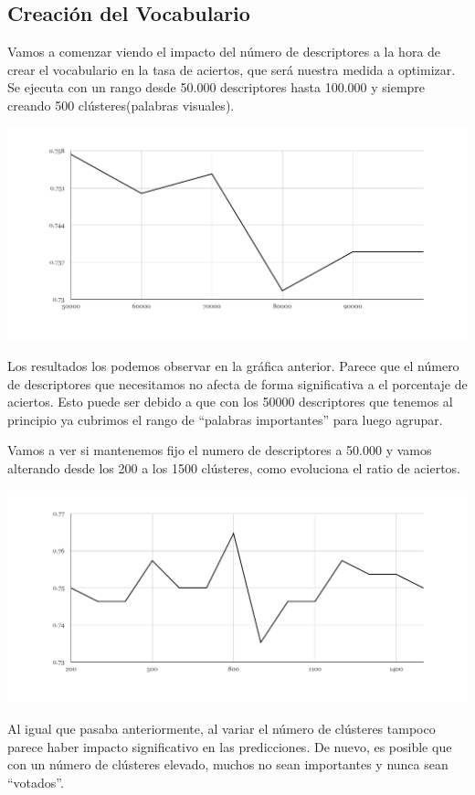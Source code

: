 \documentclass[a4paper,12pt]{article}
\begin{document}
\subsection{Creación del Vocabulario}
Vamos a comenzar viendo el impacto del número de descriptores a la hora de
crear el vocabulario en la tasa de aciertos, que será nuestra medida a 
optimizar. Se ejecuta con un rango desde 50.000 descriptores hasta 100.000 y 
siempre creando 500 clústeres(palabras visuales). 

\includegraphics[width=15cm]{charts/descriptors}

Los resultados los podemos observar en la gráfica anterior. Parece que el número
de descriptores que necesitamos no afecta de forma significativa a el 
porcentaje de aciertos. Esto puede ser debido a que con los 50000 descriptores
que tenemos al principio ya cubrimos el rango de ``palabras importantes'' para 
luego agrupar. 

Vamos a ver si mantenemos fijo el numero de descriptores a 50.000
y vamos alterando desde los 200 a los 1500 clústeres, como evoluciona el ratio
de aciertos.

\includegraphics[width=15cm]{charts/clusters}

Al igual que pasaba anteriormente, al variar el número de clústeres tampoco 
parece haber impacto significativo en las predicciones. De nuevo, es posible que
con un número de clústeres elevado, muchos no sean importantes y nunca sean
``votados''.
\end{document}
